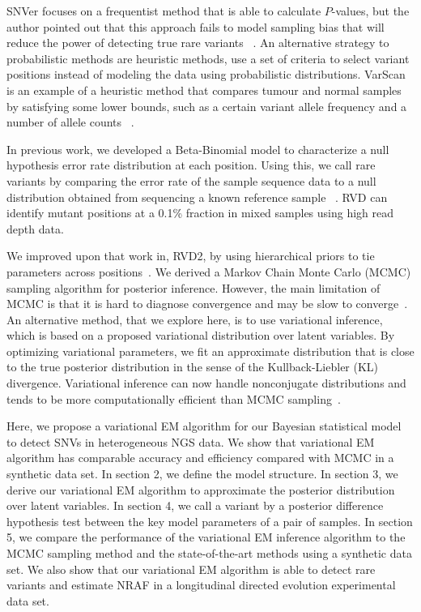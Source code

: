 \documentclass[11pt,reqno]{amsart}
\begin{document}
SNVer focuses on a frequentist method that is able to calculate $P$-values, but the author pointed out that this approach fails to model sampling bias that will reduce the power of detecting true rare variants ~\citep{wei2011snver}.
An alternative strategy to probabilistic methods are heuristic methods, use a set of criteria to select variant positions instead of modeling the data using probabilistic distributions.
VarScan is an example of a heuristic method that compares tumour and normal samples by satisfying some lower bounds, such as a certain variant allele frequency and a number of allele counts ~\citep{koboldt2012varscan}.

In previous work, we developed a Beta-Binomial model to characterize a null hypothesis error rate distribution at each position.
Using this, we call rare variants by comparing the error rate of the sample sequence data to a null distribution obtained from sequencing a known reference sample ~\citep{flaherty2011ultrasensitive}.
RVD can identify mutant positions at a 0.1\% fraction in mixed samples using high read depth data.

We improved upon that work in, RVD2, by using hierarchical priors to tie parameters across positions~\citep{he2015rvd2}.
We derived a Markov Chain Monte Carlo (MCMC) sampling algorithm for posterior inference.
However, the main limitation of MCMC is that it is hard to diagnose convergence and may be slow to converge~\citep{jordan1999introduction}.
An alternative method, that we explore here, is to use variational inference, which is based on a proposed variational distribution over latent variables.
By optimizing variational parameters, we fit an approximate distribution that is close to the true posterior distribution in the sense of the Kullback-Liebler (KL) divergence.
Variational inference can now handle nonconjugate distributions and tends to be more computationally efficient than MCMC sampling~\citep{peterson1989explorations}.

Here, we propose a variational EM algorithm for our Bayesian statistical model to detect SNVs in heterogeneous NGS data.
We show that variational EM algorithm has comparable accuracy and efficiency compared with MCMC in a synthetic data set.
In section 2, we define the model structure.
In section 3, we derive our variational EM algorithm to approximate the posterior distribution over latent variables.
In section 4, we call a variant by a posterior difference hypothesis test between the key model parameters of a pair of samples.
In section 5, we compare the performance of the variational EM inference algorithm to the MCMC sampling method and the state-of-the-art methods using a synthetic data set.
We also show that our variational EM algorithm is able to detect rare variants and estimate NRAF in a longitudinal directed evolution experimental data set.
\end{document}
